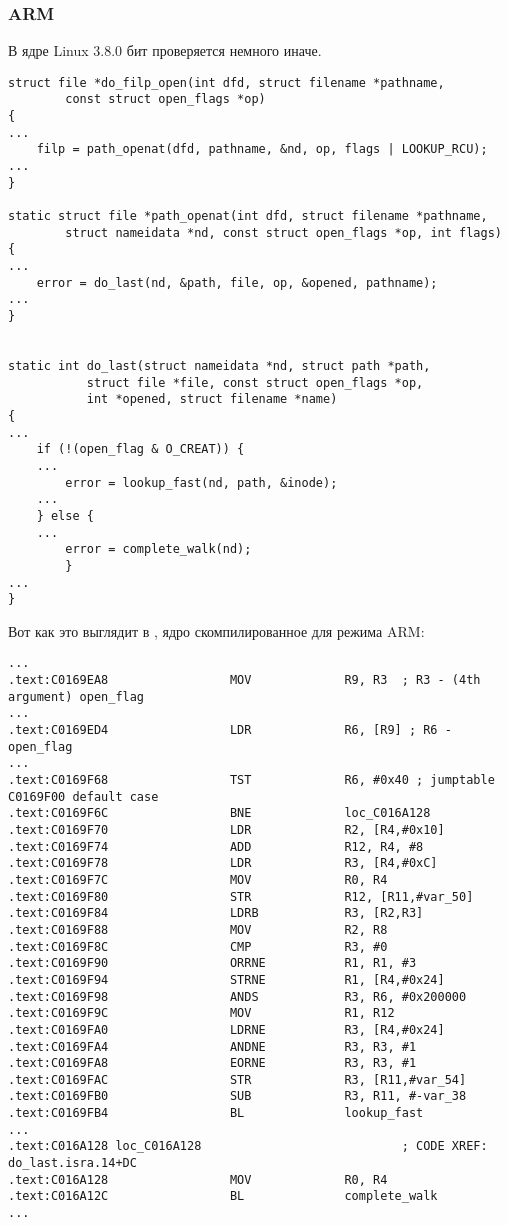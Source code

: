 \subsubsection{ARM}

В ядре Linux 3.8.0 бит  проверяется немного иначе.

\begin{lstlisting}[caption=linux kernel 3.8.0]
struct file *do_filp_open(int dfd, struct filename *pathname,
		const struct open_flags *op)
{
...
	filp = path_openat(dfd, pathname, &nd, op, flags | LOOKUP_RCU);
...
}

static struct file *path_openat(int dfd, struct filename *pathname,
		struct nameidata *nd, const struct open_flags *op, int flags)
{
...
	error = do_last(nd, &path, file, op, &opened, pathname);
...
}


static int do_last(struct nameidata *nd, struct path *path,
		   struct file *file, const struct open_flags *op,
		   int *opened, struct filename *name)
{
...
	if (!(open_flag & O_CREAT)) {
    ...
		error = lookup_fast(nd, path, &inode);
    ...
	} else {
    ...
		error = complete_walk(nd);
        }
...
}
\end{lstlisting}

Вот как это выглядит в \IDA, ядро скомпилированное для режима ARM:

\begin{lstlisting}[caption=do\_last() из vmlinux (IDA)]
...
.text:C0169EA8                 MOV             R9, R3  ; R3 - (4th argument) open_flag
...
.text:C0169ED4                 LDR             R6, [R9] ; R6 - open_flag
...
.text:C0169F68                 TST             R6, #0x40 ; jumptable C0169F00 default case
.text:C0169F6C                 BNE             loc_C016A128
.text:C0169F70                 LDR             R2, [R4,#0x10]
.text:C0169F74                 ADD             R12, R4, #8
.text:C0169F78                 LDR             R3, [R4,#0xC]
.text:C0169F7C                 MOV             R0, R4
.text:C0169F80                 STR             R12, [R11,#var_50]
.text:C0169F84                 LDRB            R3, [R2,R3]
.text:C0169F88                 MOV             R2, R8
.text:C0169F8C                 CMP             R3, #0
.text:C0169F90                 ORRNE           R1, R1, #3
.text:C0169F94                 STRNE           R1, [R4,#0x24]
.text:C0169F98                 ANDS            R3, R6, #0x200000
.text:C0169F9C                 MOV             R1, R12
.text:C0169FA0                 LDRNE           R3, [R4,#0x24]
.text:C0169FA4                 ANDNE           R3, R3, #1
.text:C0169FA8                 EORNE           R3, R3, #1
.text:C0169FAC                 STR             R3, [R11,#var_54]
.text:C0169FB0                 SUB             R3, R11, #-var_38
.text:C0169FB4                 BL              lookup_fast
...
.text:C016A128 loc_C016A128                            ; CODE XREF: do_last.isra.14+DC
.text:C016A128                 MOV             R0, R4
.text:C016A12C                 BL              complete_walk
...
\end{lstlisting}

